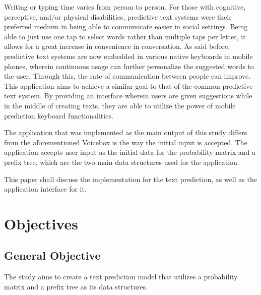 \documentclass[journal]{./IEEE/IEEEtran}
\begin{document}
Writing or typing time varies from person to person. For those with cognitive, perceptive, and/or physical disabilities, predictive text systems were their preferred medium in being able to communicate easier in social settings. \cite{GV2006} Being able to just use one tap to select words rather than multiple taps per letter, it allows for a great increase in convenience in conversation. As said before, predictive text systems are now embedded in various native keyboards in mobile phones, wherein continuous usage can further personalize the suggested words to the user. Through this, the rate of communication between people can improve. This application aims to achieve a similar goal to that of the common predictive text system. By providing an interface wherein users are given suggestions while in the middle of creating texts, they are able to utilize the power of mobile prediction keyboard functionalities.


The application that was implemented as the main output of this study differs from the aforementioned Voicebox is the way the initial input is accepted. The application accepts user input as the initial data for the probability matrix and a prefix tree, which are the two main data structures used for the application.

This paper shall discuss the implementation for the text prediction, as well as the application interface for it.

\section{Objectives}

\subsection{General Objective}
The study aims to create a text prediction model that utilizes a probability matrix and a prefix tree as its data structures.
\end{document}
